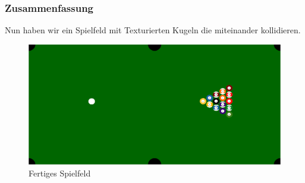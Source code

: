 	\subsubsection{Zusammenfassung}
		 Nun haben wir ein Spielfeld mit Texturierten Kugeln die miteinander kollidieren.
		 \begin{figure}[h]
		 	\caption{Fertiges Spielfeld}
		 	\includegraphics[width=\textwidth]{bilder/Spielfeld.png}
		 \end{figure}

